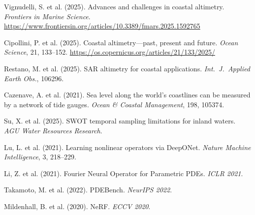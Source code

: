 \documentclass[12pt,a4paper]{article}
\begin{document}
\begin{enumerate}[label={[\arabic*]}, nosep]
  \item Vignudelli, S. et al. (2025). Advances and challenges in coastal altimetry. \textit{Frontiers in Marine Science}.
        \url{https://www.frontiersin.org/articles/10.3389/fmars.2025.1592765}
  \item Cipollini, P. et al. (2025). Coastal altimetry---past, present and future. \textit{Ocean Science}, 21, 133--152.
        \url{https://os.copernicus.org/articles/21/133/2025/}
  \item Restano, M. et al. (2025). SAR altimetry for coastal applications. \textit{Int.\ J.\ Applied Earth Obs.}, 106296.
  \item Cazenave, A. et al. (2021). Sea level along the world's coastlines can be measured by a network of tide gauges. \textit{Ocean \& Coastal Management}, 198, 105374.
  \item Su, X. et al. (2025). SWOT temporal sampling limitations for inland waters. \textit{AGU Water Resources Research}.
  \item Lu, L. et al. (2021). Learning nonlinear operators via DeepONet. \textit{Nature Machine Intelligence}, 3, 218--229.
  \item Li, Z. et al. (2021). Fourier Neural Operator for Parametric PDEs. \textit{ICLR 2021}.
  \item Takamoto, M. et al. (2022). PDEBench. \textit{NeurIPS 2022}.
  \item Mildenhall, B. et al. (2020). NeRF. \textit{ECCV 2020}.
\end{enumerate}
\end{document}
